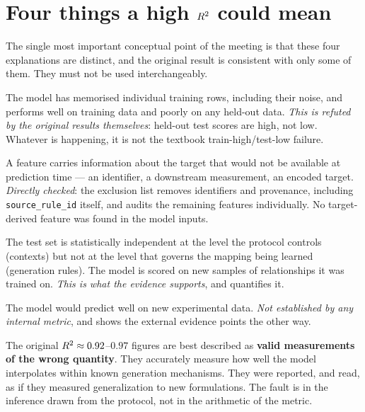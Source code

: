 \section{Four things a high $R^2$ could mean}

The single most important conceptual point of the meeting is that these
four explanations are distinct, and the original result is consistent with
only some of them. They must not be used interchangeably.

\begin{description}[leftmargin=1.6em, style=nextline, font=\bfseries\color{dgreen}]
\item[1. Classical overfitting] The model has memorised individual
  training rows, including their noise, and performs well on training data
  and poorly on any held-out data. \emph{This is refuted by the original
  results themselves}: held-out test scores are high, not low. Whatever is
  happening, it is not the textbook train-high/test-low failure.

\item[2. Data leakage] A feature carries information about the target that
  would not be available at prediction time --- an identifier, a downstream
  measurement, an encoded target. \emph{Directly checked}: the exclusion
  list removes identifiers and provenance, including
  \texttt{source\_rule\_id} itself, and  audits the
  remaining features individually. No target-derived feature was found in
  the model inputs.

\item[3. Optimistic evaluation from shared generative structure] The test
  set is statistically independent at the level the protocol controls
  (contexts) but not at the level that governs the mapping being learned
  (generation rules). The model is scored on new samples of relationships
  it was trained on. \emph{This is what the evidence supports}, and
   quantifies it.

\item[4. Genuine generalization to independent observations] The model
  would predict well on new experimental data. \emph{Not established by
  any internal metric}, and  shows the external evidence
  points the other way.
\end{description}

\begin{findingbox}[title=The precise claim]
The original $R^2 \approx 0.92$--$0.97$ figures are best described as
\textbf{valid measurements of the wrong quantity}. They accurately measure
how well the model interpolates within known generation mechanisms. They
were reported, and read, as if they measured generalization to new
formulations. The fault is in the inference drawn from the protocol, not
in the arithmetic of the metric.
\end{findingbox}
